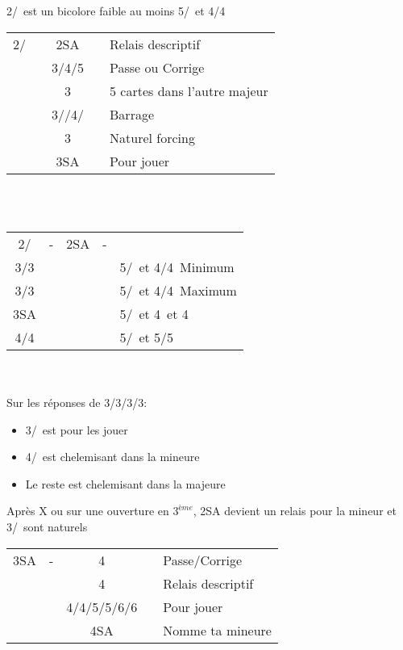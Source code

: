 \documentclass[a4paper, oneside, 11pt]{report}
\begin{document}
	2\coeur/\pique\ est un bicolore faible au moins 5\coeur/\pique\ et 4\trefle/4\carreau\\

	\begin{tabular}{cccc|l}
	2\coeur/\pique && 2SA && Relais descriptif\\
	&& 3\trefle/4\trefle/5\trefle && Passe ou Corrige\\
	&& 3\carreau && 5 cartes dans l'autre majeur\\
	&& 3\coeur/\pique/4\coeur/\pique && Barrage\\
	&& 3\pique && Naturel forcing\\
	&& 3SA && Pour jouer\\
	\end{tabular}\\\\

	\begin{tabular}{cccc|l}
	2\coeur/\pique & - & 2SA & - &\\
	3\trefle/3\carreau &&&& 5\coeur/\pique\ et 4\trefle/4\carreau\ Minimum\\
	3\coeur/3\pique &&&& 5\coeur/\pique\ et 4\trefle/4\carreau\ Maximum\\
	3SA &&&& 5\coeur/\pique\ et 4\trefle\ et 4\carreau\\
	4\trefle/4\carreau &&&& 5\coeur/\pique\ et 5\trefle/5\carreau\\
	\end{tabular}\\\\
	
	Sur les réponses de 3\trefle/3\carreau/3\coeur/3\pique:
	\begin{itemize}
	\item 3\coeur/\pique\ est pour les jouer
	\item 4\trefle/\carreau\ est chelemisant dans la mineure
	\item Le reste est chelemisant dans la majeure\\
	\end{itemize}
	
	Après X ou sur une ouverture en $3^{ème}$, 2SA devient un relais pour la mineur et 3\trefle/\carreau\ sont naturels\\

	\begin{tabular}{cccc|l}
	3SA & - & 4\trefle && Passe/Corrige\\
	&& 4\carreau && Relais descriptif\\
	&& 4\coeur/4\pique/5\trefle/5\carreau/6\trefle/6\carreau && Pour jouer\\
	&& 4SA && Nomme ta mineure\\
	\end{tabular}\\\\
	
\end{document}
